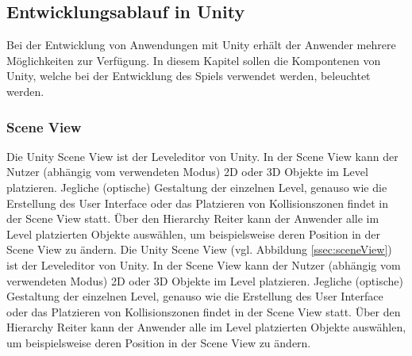 \subsection{Entwicklungsablauf in Unity}
Bei der Entwicklung von Anwendungen mit Unity erhält der Anwender mehrere Möglichkeiten zur Verfügung. In diesem Kapitel sollen die Kompontenen von Unity, welche bei der Entwicklung des Spiels verwendet werden, beleuchtet werden.

\subsubsection{Scene View}
Die Unity Scene View ist der Leveleditor von Unity. In der Scene View kann der Nutzer (abhängig vom verwendeten Modus) 2D oder 3D Objekte im Level platzieren. Jegliche (optische) Gestaltung der einzelnen Level, genauso wie die Erstellung des User Interface oder das Platzieren von Kollisionszonen findet in der Scene View statt. Über den Hierarchy Reiter kann der Anwender alle im Level platzierten Objekte auswählen, um beispielsweise deren Position in der Scene View zu ändern.
Die Unity Scene View (vgl. Abbildung \ref{ssec:sceneView}) ist der Leveleditor von Unity. In der Scene View kann der Nutzer (abhängig vom verwendeten Modus) 2D oder 3D Objekte im Level platzieren. Jegliche (optische) Gestaltung der einzelnen Level, genauso wie die Erstellung des User Interface oder das Platzieren von Kollisionszonen findet in der Scene View statt. Über den Hierarchy Reiter kann der Anwender alle im Level platzierten Objekte auswählen, um beispielsweise deren Position in der Scene View zu ändern. 

